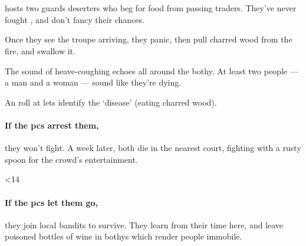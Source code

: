 \assignHumanName[\gOne]
\assignHumanName[\gTwo]


\subsubsection{\composeHumanName\ }
hosts two \glspl{guard} deserters who beg for food from passing traders.
They've never fought , and don't fancy their chances.

Once they see the troupe arriving, they panic, then pull charred wood from the fire, and swallow it.

\begin{boxtext}
  The sound of heave-coughing echoes all around the \gls{bothy}.
  At least two people --- a man and a woman --- sound like they're dying.
\end{boxtext}

An  roll at \tn[10] lets  identify the `disease' (eating charred wood).


\paragraph{If the \glspl{pc} arrest them,}
they won't fight.
A week later, both die in the nearest \gls{court}, fighting  with a rusty spoon for the crowd's entertainment.

\ifnum\thepage<14
  \paragraph{If the \glspl{pc} let them go,}
  they join local bandits to survive.
  They learn from their time here, and leave poisoned bottles of wine in \glspl{bothy} which render people immobile.
\fi

